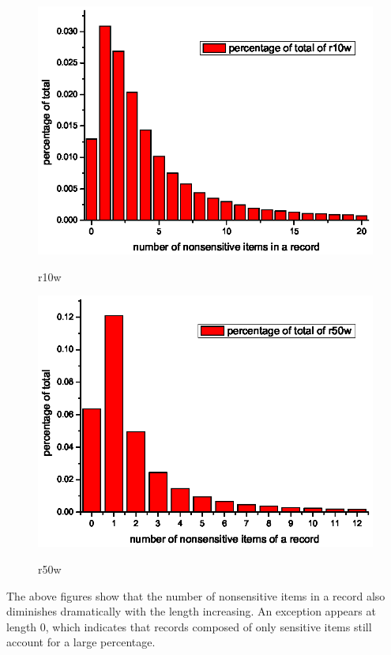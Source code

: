 \documentclass{article}
\begin{document}
\begin{figure}[htb]
   \centering
  \includegraphics[scale=.8]{r10wnon.eps}\\
  \caption{r10w}\label{fig:graph}
\end{figure}

\begin{figure}[htb]
   \centering
  \includegraphics[scale=.8]{r50wnon.eps}\\
  \caption{r50w}\label{fig:graph}
\end{figure}
The above figures show that the number of nonsensitive items in a record also diminishes dramatically with the length increasing. An exception appears at length 0, which indicates that records composed of only sensitive items still account for a large percentage.
\end{document}
